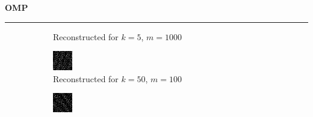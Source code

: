 \documentclass[a4paper,12pt]{article}
\newenvironment{solution}[2][]{%
    \begin{mdframed}[linecolor=blue!70!black, linewidth=2pt, roundcorner=10pt, backgroundcolor=yellow!10!white, skipabove=12pt, skipbelow=12pt]%
        \textbf{\large #2}
        \par\noindent\rule{\textwidth}{0.4pt}
}{
    \end{mdframed}
}
\begin{document}
\begin{solution}{OMP}
\begin{figure}[H]
\begin{subfigure}[t]{0.23\textwidth}
        \caption{Reconstructed for $k = 5$, $m = 1000$}
    \end{subfigure}
    \begin{subfigure}[t]{0.23\textwidth}
        \centering
        \includegraphics[width=\textwidth]{../images/omp/Reconstructed_k_50_m_100.png}
        \caption{Reconstructed for $k = 50$, $m = 100$}
    \end{subfigure}
    \begin{subfigure}[t]{0.23\textwidth}
        \centering
        \includegraphics[width=\textwidth]{../images/omp/Reconstructed_k_50_m_200.png}

\end{subfigure}
\end{figure}
\end{solution}
\end{document}
